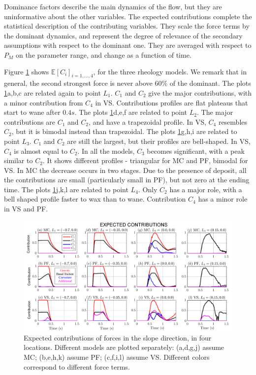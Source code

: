\documentclass{article}
\begin{document}
Dominance factors describe the main dynamics of the flow, but they are uninformative about the other variables. The expected contributions complete the statistical description of the contributing variables. They scale the force terms by the dominant dynamics, and represent the degree of relevance of the secondary assumptions with respect to the dominant one. They are averaged with respect to $P_M$ on the parameter range, and change as a function of time.

Figure \ref{fig:Ramp-Ci_x} shows $\mathbb E[C_i]_{i=1,\dots,4}$, for the three rheology models. We remark that in general, the second strongest force is never above 60\% of the dominant. The plots \ref{fig:Ramp-Ci_x}a,b,c are related again to point $L_1$. $C_1$ and $C_2$ give the major contributions, with a minor contribution from $C_4$ in VS. Contributions profiles are flat plateaus that start to wane after $0.4 s$. The plots \ref{fig:Ramp-Ci_x}d,e,f are related to point $L_2$. The major contributions are $C_1$ and $C_2$, and have a trapezoidal profile. In VS, $C_4$ resembles $C_2$, but it is bimodal instead than trapezoidal. The plots \ref{fig:Ramp-Ci_x}g,h,i are related to point $L_3$. $C_1$ and $C_2$ are still the largest, but their profiles are bell-shaped. In VS, $C_4$ is almost equal to $C_2$. In all the models, $C_3$ becomes significant, with a peak similar to $C_2$. It shows different profiles - triangular for MC and PF, bimodal for VS. In MC the decrease occurs in two stages. Due to the presence of deposit, all the contributions are small (particularly small in PF), but not zero at the ending time. The plots \ref{fig:Ramp-Ci_x}j,k,l are related to point $L_4$. Only $C_2$ has a major role, with a bell shaped profile faster to wax than to wane. Contribution $C_4$ has a minor role in VS and PF.
\begin{figure}[H]
         \centering
        \includegraphics[width=1\textwidth]{figures/incline/Ci_x.png}
        \caption{Expected contributions of forces in the slope direction, in four locations. Different models are plotted separately: (a,d,g,j) assume MC; (b,e,h,k) assume PF; (c,f,i,l) assume VS. Different colors correspond to different force terms.}
        \label{fig:Ramp-Ci_x}
\end{figure}
\end{document}
